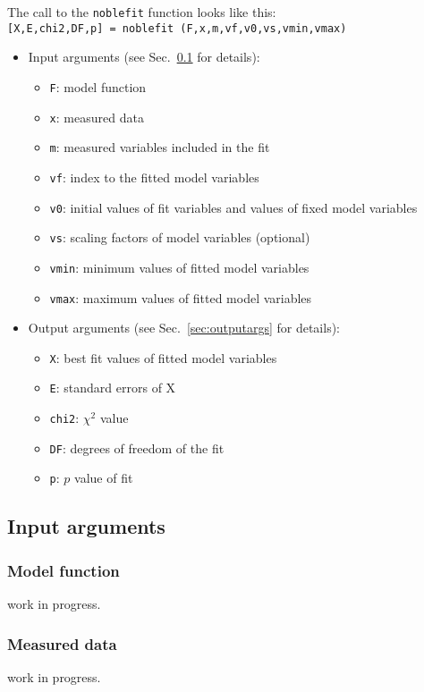 \documentclass[12pt]{article}
\newcommand{\secref}[1]{Sec.~\ref{sec:#1}}
\begin{document}
The call to the {\tt noblefit} function looks like this:\\
{\tt [X,E,chi2,DF,p] = noblefit (F,x,m,vf,v0,vs,vmin,vmax)}
\begin{itemize}
\item Input arguments (see \secref{inputargs} for details):
\begin{itemize}
	\item {\tt F}: model function
	\item {\tt x}: measured data
	\item {\tt m}: measured variables included in the fit
	\item {\tt vf}: index to the fitted model variables
	\item {\tt v0}: initial values of fit variables and values of fixed model variables
	\item {\tt vs}: scaling factors of model variables (optional)
	\item {\tt vmin}: minimum values of fitted model variables
	\item {\tt vmax}: maximum values of fitted model variables
\end{itemize}
\item Output arguments (see \secref{outputargs} for details):
\begin{itemize}
	\item {\tt X}: best fit values of fitted model variables
	\item {\tt E}: standard errors of X
	\item {\tt chi2}: $\chi^2$ value
	\item {\tt DF}: degrees of freedom of the fit
	\item {\tt p}: $p$ value of fit
\end{itemize}
\end{itemize}
\par

\subsection{Input arguments}\label{sec:inputargs}
\subsubsection{Model function}
work in progress.

\subsubsection{Measured data}
work in progress.
\end{document}
